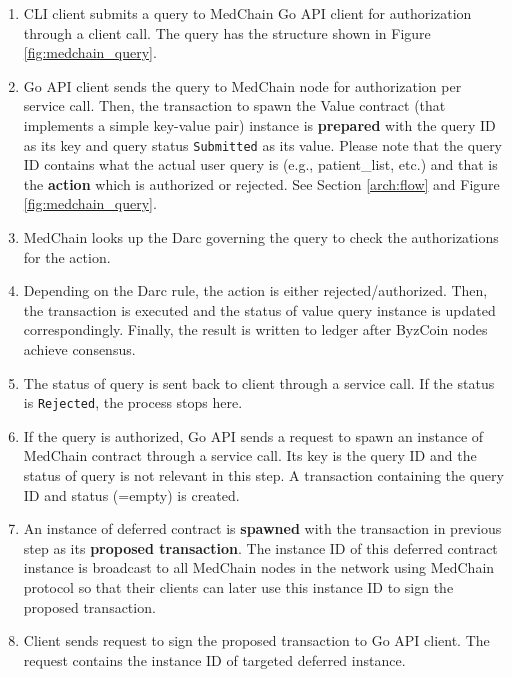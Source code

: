 \begin{enumerate}
    \item CLI client submits a query to MedChain Go API client for authorization through a client call. The query has the structure shown in Figure \ref{fig:medchain_query}. 
    
    \item Go API client sends the query to MedChain node for authorization per service call. Then, the transaction to spawn the Value contract (that implements a simple key-value pair) instance is \textbf{prepared} with the query ID as its key and query status \texttt{Submitted} as its value. Please note that the query ID contains what the actual user query is (e.g., patient\_list, etc.) and that is the \textbf{action} which is authorized or rejected. See Section \ref{arch:flow} and Figure \ref{fig:medchain_query}. 
    
    \item MedChain looks up the Darc governing the query to check the authorizations for the action. 
    
    
    \item Depending on the Darc rule, the action is either rejected/authorized. Then, the transaction is executed and the status of value query instance is updated correspondingly. Finally, the result is written to ledger after ByzCoin nodes achieve consensus. 
    
    \item The status of query is sent back to client through a service call. If the status is \texttt{Rejected}, the process stops here. 
    
    \item If the query is authorized, Go API sends a request to spawn an instance of MedChain contract through a service call. Its key is the query ID and the status of query is not relevant in this step. A transaction containing the query ID and status (=empty) is created. 
    
    \item An instance of deferred contract is \textbf{spawned} with the transaction in previous step as its \textbf{proposed transaction}. The instance ID of this deferred contract instance is broadcast to all MedChain nodes in the network using MedChain protocol so that their clients can later use this instance ID to sign the proposed transaction.
    
    \item Client sends request to sign the proposed transaction to Go API client. The request contains the instance ID of targeted deferred instance.  
    

\end{enumerate}
